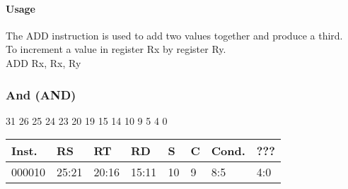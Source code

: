 \documentclass[12pt]{article}
\begin{document}
    \paragraph{Usage}
    \begin{flushleft}
    The ADD instruction is used to add two values together and produce a third.\\
    \vspace{1em}
    To increment a value in register Rx by register Ry.\\
    \vspace{1em}
    ADD Rx, Rx, Ry
    \end{flushleft}
    




    \newpage
    \subsubsection{And (AND)}
    
    \hspace{1.6cm}31 \hspace{1.2cm}26 \hspace{.075cm}25 \hspace{.15cm}24 \hspace{.075cm}23 \hspace{.875cm}20 \hspace{.04cm}19 \hspace{.8cm}15 \hspace{.04cm}14 \hspace{.8cm}10 \hspace{.04cm}9 \hspace{1.15cm}5 \hspace{.04cm}4 \hspace{1.25cm}0
    \vspace{-.25cm}
        \begin{center}
        \vspace{1em}
        \begin{tabular}{ |p{1.8cm}|p{1.5cm}|p{1.5cm}|p{1.5cm}|p{0.3cm}|p{0.3cm}|p{1.5cm}|p{1.5cm}| }
            \hline
            \textbf{Inst.} & \textbf{RS}& \textbf{RT} & \textbf{RD} & \textbf{S} & \textbf{C} & \textbf{Cond.} & ???\\
            \hline
            000010& 25:21 & 20:16 & 15:11 & 10 & 9 & 8:5 &4:0\\
            \hline
        \end{tabular}
    \end{center}
    
\end{document}
